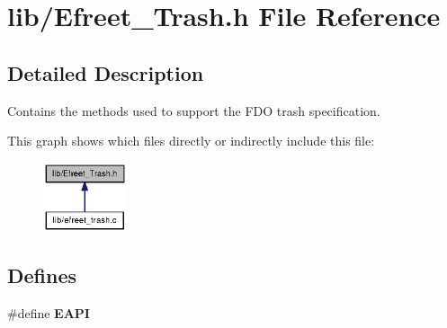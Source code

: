 \section{lib/Efreet\_\-Trash.h File Reference}
\label{Efreet__Trash_8h}


\subsection{Detailed Description}
Contains the methods used to support the FDO trash specification. 





This graph shows which files directly or indirectly include this file:\nopagebreak
\begin{figure}[H]
\begin{center}
\leavevmode
\includegraphics[width=70pt]{Efreet__Trash_8h__dep__incl}
\end{center}
\end{figure}
\subsection*{Defines}
\begin{CompactItemize}
\item 
\#define {\bf EAPI}
\end{CompactItemize}
